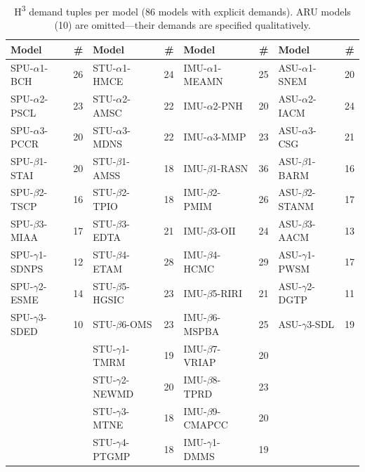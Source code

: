 \begin{table}[H]
\centering
\caption{H\textsuperscript{3} demand tuples per model (86 models with explicit demands).
ARU models (10) are omitted---their demands are specified qualitatively.}
\label{tab:per-model-demand}
\renewcommand{\arraystretch}{1.05}
{\scriptsize
\begin{tabular}{@{}lr|lr|lr|lr@{}}
\toprule
\textbf{Model} & \textbf{\#} &
\textbf{Model} & \textbf{\#} &
\textbf{Model} & \textbf{\#} &
\textbf{Model} & \textbf{\#} \\
\midrule
\rowcolor{grpA!15}
SPU-$\alpha$1-BCH  & 26 & STU-$\alpha$1-HMCE & 24 & IMU-$\alpha$1-MEAMN & 25 & ASU-$\alpha$1-SNEM & 20 \\
\rowcolor{grpA!15}
SPU-$\alpha$2-PSCL & 23 & STU-$\alpha$2-AMSC & 22 & IMU-$\alpha$2-PNH   & 20 & ASU-$\alpha$2-IACM & 24 \\
\rowcolor{grpA!15}
SPU-$\alpha$3-PCCR & 20 & STU-$\alpha$3-MDNS & 22 & IMU-$\alpha$3-MMP   & 23 & ASU-$\alpha$3-CSG  & 21 \\
\rowcolor{grpA!8}
SPU-$\beta$1-STAI  & 20 & STU-$\beta$1-AMSS  & 18 & IMU-$\beta$1-RASN   & 36 & ASU-$\beta$1-BARM  & 16 \\
\rowcolor{grpA!8}
SPU-$\beta$2-TSCP  & 16 & STU-$\beta$2-TPIO  & 18 & IMU-$\beta$2-PMIM   & 26 & ASU-$\beta$2-STANM & 17 \\
\rowcolor{grpA!8}
SPU-$\beta$3-MIAA  & 17 & STU-$\beta$3-EDTA  & 21 & IMU-$\beta$3-OII    & 24 & ASU-$\beta$3-AACM  & 13 \\
\rowcolor{grpA!4}
SPU-$\gamma$1-SDNPS& 12 & STU-$\beta$4-ETAM  & 28 & IMU-$\beta$4-HCMC   & 29 & ASU-$\gamma$1-PWSM & 17 \\
\rowcolor{grpA!4}
SPU-$\gamma$2-ESME & 14 & STU-$\beta$5-HGSIC & 23 & IMU-$\beta$5-RIRI   & 21 & ASU-$\gamma$2-DGTP & 11 \\
\rowcolor{grpA!4}
SPU-$\gamma$3-SDED & 10 & STU-$\beta$6-OMS   & 23 & IMU-$\beta$6-MSPBA  & 25 & ASU-$\gamma$3-SDL  & 19 \\
                    &    & STU-$\gamma$1-TMRM & 19 & IMU-$\beta$7-VRIAP  & 20 &                    &    \\
                    &    & STU-$\gamma$2-NEWMD& 20 & IMU-$\beta$8-TPRD   & 23 &                    &    \\
                    &    & STU-$\gamma$3-MTNE & 18 & IMU-$\beta$9-CMAPCC & 20 &                    &    \\
                    &    & STU-$\gamma$4-PTGMP& 18 & IMU-$\gamma$1-DMMS  & 19 &                    &    \\

\end{tabular}}
\end{table}
